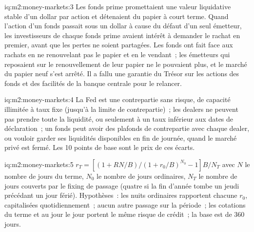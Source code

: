 \begin{solution}{iq:m2:money-markets:3}
Les fonds prime promettaient une valeur liquidative stable d'un dollar par action et détenaient du papier à court terme. Quand l'action d'un fonds
passait sous un dollar à cause du défaut d'un seul émetteur, les investisseurs de
chaque fonds prime avaient intérêt à demander le rachat en premier, avant que les pertes ne soient partagées.
Les fonds ont fait face aux rachats en ne renouvelant pas le papier et en le vendant~; les émetteurs qui
reposaient sur le renouvellement de leur papier ne le pouvaient plus, et le marché du papier neuf s'est arrêté. Il
a fallu une garantie du Trésor sur les actions des fonds et des facilités de la banque centrale pour
le relancer.
\end{solution}

\begin{solution}{iq:m2:money-markets:4}
La Fed est une contrepartie sans risque, de capacité illimitée à taux fixe
(jusqu'à la limite de contrepartie)~; les dealers ne peuvent pas prendre toute la liquidité, ou seulement à
un taux inférieur aux dates de déclaration~; un fonds peut avoir des plafonds de contrepartie avec
chaque dealer, ou vouloir garder ses liquidités disponibles en fin de journée, quand le
marché privé est fermé. Les 10 points de base sont le prix de ces
écarts.
\end{solution}

\begin{solution}{iq:m2:money-markets:5}
$r_T = [(1 + R N/B)/(1 + r_0/B)^{N_0} - 1] B/N_T$ avec $N$ le nombre de jours du terme,
$N_0$ le nombre de jours ordinaires, $N_T$ le nombre de jours couverts par le fixing de passage (quatre si la
fin d'année tombe un jeudi précédant un jour férié). Hypothèses~: les nuits ordinaires rapportent
chacune $r_0$, capitalisées quotidiennement~; aucun autre passage sur la période~; les cotations du terme et
au jour le jour portent le même risque de crédit~; la base est de 360 jours.
\end{solution}

